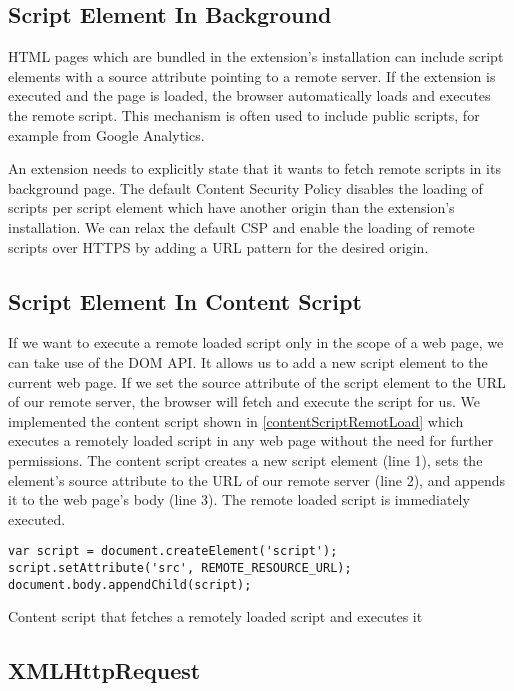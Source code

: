 \subsection{Script Element In Background}
	
	HTML pages which are bundled in the extension's installation can include script elements with a source attribute pointing to a remote server. If the extension is executed and the page is loaded, the browser automatically loads and executes the remote script. This mechanism is often used to include public scripts, for example from Google Analytics. 
	
	An extension needs to explicitly state that it wants to fetch remote scripts in its background page. The default Content Security Policy disables the loading of scripts per script element which have another origin than the extension's installation. We can relax the default CSP and enable the loading of remote scripts over HTTPS by adding a URL pattern for the desired origin. 
	
\subsection{Script Element In Content Script}

	If we want to execute a remote loaded script only in the scope of a web page, we can take use of the DOM API. It allows us to add a new script element to the current web page. If we set the source attribute of the script element to the URL of our remote server, the browser will fetch and execute the script for us. We implemented the content script shown in \autoref{contentScriptRemotLoad} which executes a remotely loaded script in any web page without the need for further permissions. The content script creates a new script element (line 1), sets the element's source attribute to the URL of our remote server (line 2), and appends it to the web page's body (line 3). The remote loaded script is immediately executed.
	
	\begin{code}
		\begin{lstlisting}	
var script = document.createElement('script');
script.setAttribute('src', REMOTE_RESOURCE_URL);
document.body.appendChild(script);
\end{lstlisting}
		\caption{Content script that fetches a remotely loaded script and executes it}
		\label{contentScriptRemotLoad}
	\end{code}
	
\subsection{XMLHttpRequest}
\label{sec:xhr}

